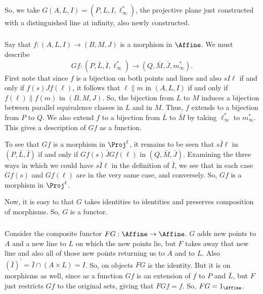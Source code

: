 \documentclass[../../main]{subfiles}
\begin{document}
\subparagraph{}
So, we take $G(A,L,I)=(P,L,I,\ell^*_\infty)$, the projective plane just
constructed with a distinguished line at infinity, also newly constructed.

\subparagraph{}
Say that $f:(A,L,I)\rightarrow(B,M,J)$ is a morphism in $\Affine$. We must
describe
\[Gf:(P,\bar L,\bar I,\ell^*_\infty)\rightarrow(Q,\bar M,\bar J,m^*_\infty).\]
First note that since $f$ is a bijection on both points and lines and also
$sI\ell$ if and only  if $f(s)Jf(\ell)$, it follows that $\ell\parallel m$ in
$(A,L,I)$ if and only if $f(\ell)\parallel f(m)$ in $(B,M,J)$.  So, the
bijection from $L$ to $M$ induces a bijection between parallel equivalence
classes in $L$ and in $M$. Thus, $f$ extends to a bijection from $P$ to $Q$.  We
also extend $f$ to a bijection from $\bar L$ to $\bar M$ by taking
$\ell^*_\infty$ to $m^*_\infty$. This gives a description of $Gf$ as a function.

To see that $Gf$ is a morphism in $\Proj^\ell$, it remains to be seen that
$s\bar I\ell$ in $(P,\bar L,\bar I)$ if and only if $Gf(s)\bar JGf(\ell)$ in
$(Q,\bar M, \bar J)$. Examining the three ways in which we could have $s\bar
I\ell$ in the definition of $\bar I$, we see that in each case $Gf(s)$ and
$Gf(\ell)$ are in the very same case, and conversely. So, $Gf$ is a morphism in
$\Proj^\ell$.

Now, it is easy to that $G$ takes identities to identities and preserves
composition of morphisms. So, $G$ is a functor.

\subparagraph{}
Consider the composite functor $FG:\Affine\rightarrow\Affine$. $G$ adds new
points to $A$ and a new line to $L$ on which the new points lie, but $F$ takes
away that new line and also all of those new points returning  us to $A$ and to
$L$. Also $(\bar I)^\prime =\bar I\cap(A\times L)=I$. So,  on objects $FG$ is
the identity. But it is on morphisms as well, since as a function $Gf$ is an
extension of $f$ to $P$ and $\bar L$, but $F$ just restricts $Gf$ to the
original sets, giving that $FGf=f$. So, $FG=1_\Affine$.
\end{document}
